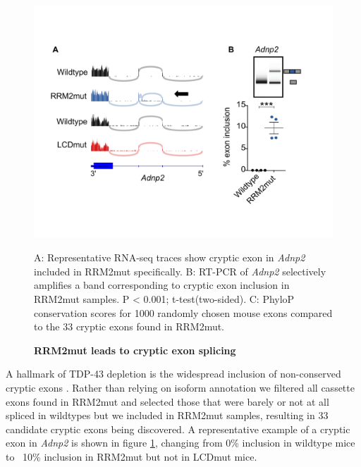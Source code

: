 \begin{figure}[h!]
	\begin{center}
		\includegraphics[width=14cm]{Figures/05_tdp_mice/cryptic_exon_multi.png}
	\end{center}
	\caption{\textbf{RRM2mut leads to cryptic exon splicing}}
	\label{cryptic_multi}
	A: Representative RNA-seq traces show cryptic exon in \textit{Adnp2} included in RRM2mut specifically. B: RT-PCR of \textit{Adnp2} selectively amplifies a band corresponding to cryptic exon inclusion in RRM2mut samples. P < 0.001; t-test(two-sided). C: PhyloP conservation scores for 1000 randomly chosen mouse exons compared to the 33 cryptic exons found in RRM2mut.
\end{figure}

A hallmark of TDP-43 depletion is the widespread inclusion of non-conserved cryptic exons \citep{Ling2015}. Rather than relying on isoform annotation we filtered all cassette exons found in RRM2mut and selected those that were barely or not at all spliced in wildtypes but we included in RRM2mut samples, resulting in 33 candidate cryptic exons being discovered. A representative example of a cryptic exon in \textit{Adnp2} is shown in figure \ref{cryptic_multi}, changing from 0\% inclusion in wildtype mice to ~10\% inclusion in RRM2mut but not in LCDmut mice.  

